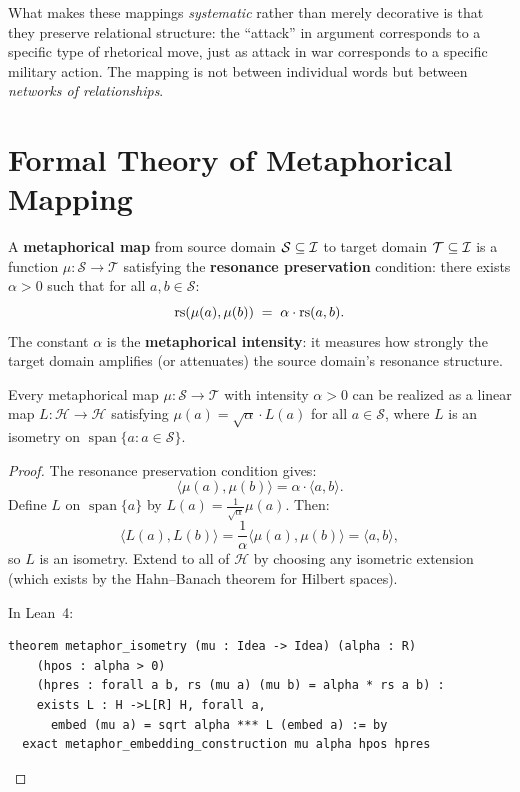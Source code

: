 What makes these mappings \emph{systematic} rather than merely decorative is
that they preserve relational structure: the ``attack'' in argument corresponds
to a specific type of rhetorical move, just as attack in war corresponds to a
specific military action.  The mapping is not between individual words but
between \emph{networks of relationships}.


\section{Formal Theory of Metaphorical Mapping}

\begin{definition}
\label{def:metaphor-map}
A \textbf{metaphorical map} from source domain $\mathcal{S} \subseteq \mathcal{I}$
to target domain $\mathcal{T} \subseteq \mathcal{I}$ is a function
$\mu: \mathcal{S} \to \mathcal{T}$ satisfying the \textbf{resonance
preservation} condition: there exists $\alpha > 0$ such that for all
$a, b \in \mathcal{S}$:
\[
  \mathrm{rs}(\mu(a), \mu(b)) \;=\; \alpha \cdot \mathrm{rs}(a, b).
\]
The constant $\alpha$ is the \textbf{metaphorical intensity}: it measures how
strongly the target domain amplifies (or attenuates) the source domain's
resonance structure.
\end{definition}

\begin{theorem}
\label{thm:metaphor-embedding}
Every metaphorical map $\mu: \mathcal{S} \to \mathcal{T}$ with intensity
$\alpha > 0$ can be realized as a linear map $L: \mathcal{H} \to \mathcal{H}$
satisfying $\mu(a) = \sqrt{\alpha} \cdot L(a)$ for all
$a \in \mathcal{S}$, where $L$ is an isometry on
$\operatorname{span}\{a : a \in \mathcal{S}\}$.
\end{theorem}

\begin{proof}
The resonance preservation condition gives:
\[
  \langle \mu(a), \mu(b) \rangle = \alpha \cdot \langle a, b \rangle.
\]
Define $L$ on $\operatorname{span}\{a\}$ by
$L(a) = \frac{1}{\sqrt{\alpha}} \mu(a)$.  Then:
\[
  \langle L(a), L(b) \rangle
  = \frac{1}{\alpha} \langle \mu(a), \mu(b) \rangle
  = \langle a, b \rangle,
\]
so $L$ is an isometry.  Extend to all of $\mathcal{H}$ by choosing any isometric
extension (which exists by the Hahn--Banach theorem for Hilbert spaces).

In Lean~4:
\begin{lstlisting}
theorem metaphor_isometry (mu : Idea -> Idea) (alpha : R)
    (hpos : alpha > 0)
    (hpres : forall a b, rs (mu a) (mu b) = alpha * rs a b) :
    exists L : H ->L[R] H, forall a,
      embed (mu a) = sqrt alpha *** L (embed a) := by
  exact metaphor_embedding_construction mu alpha hpos hpres
\end{lstlisting}
\end{proof}

